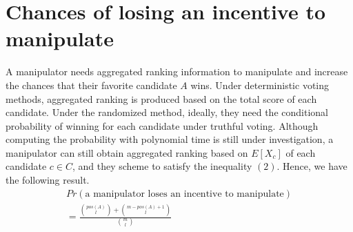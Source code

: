 \documentclass[letterpaper]{article} %
\begin{document}
\section{Chances of losing an incentive to manipulate}
A manipulator needs aggregated ranking information to manipulate and increase the chances that their favorite candidate $A$ wins. Under deterministic voting methods, aggregated ranking is produced based on the total score of each candidate. Under the randomized method, ideally, they need the conditional probability of winning for each candidate under truthful voting. Although computing the probability with polynomial time is still under investigation, a manipulator can still obtain aggregated ranking based on $E[X_c]$ of each candidate $c \in C$, and they scheme to satisfy the inequality $(2)$.
Hence, we have the following result.
\begin{equation}
\begin{split}
Pr(\text{a manipulator loses an incentive to manipulate})\\
= \frac{\binom{pos(A)}{l}+\binom{m-pos(A)+1}{l}}{\binom{m}{l}}
\end{split}
\end{equation}
\end{document}
